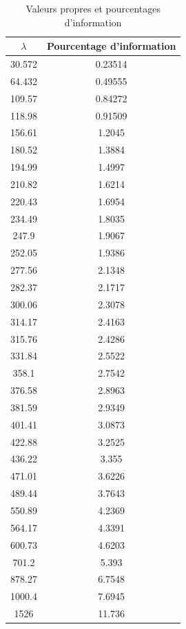 \documentclass[11pt]{article}
\begin{document}
\begin{table}[h] \centering \caption{Valeurs propres et pourcentages d'information}
\begin{tabular}{|c|c|}
  \hline
\rowcolor{gray!40}\bfseries $\lambda$ &\textbf{Pourcentage d'information}\\
  \hline
          30.572  &    0.23514\\\hline
       64.432     & 0.49555\\\hline
       109.57     & 0.84272\\\hline
       118.98      &0.91509\\\hline
       156.61       &1.2045\\\hline
       180.52       &1.3884\\\hline
       194.99       &1.4997\\\hline
       210.82       &1.6214\\\hline
       220.43       &1.6954\\\hline
       234.49       &1.8035\\\hline
        247.9       &1.9067\\\hline
       252.05      & 1.9386\\\hline
       277.56       &2.1348\\\hline
       282.37      & 2.1717\\\hline
       300.06     &  2.3078\\\hline
       314.17      & 2.4163\\\hline
       315.76       &2.4286\\\hline
       331.84       &2.5522\\\hline
        358.1     &  2.7542\\\hline
       376.58     &  2.8963\\\hline
       381.59      & 2.9349\\\hline
       401.41       &3.0873\\\hline
       422.88       &3.2525\\\hline
       436.22        &3.355\\\hline
       471.01      & 3.6226\\\hline
       489.44       &3.7643\\\hline
       550.89      & 4.2369\\\hline
       564.17       &4.3391\\\hline
       600.73       &4.6203\\\hline
        701.2        &5.393\\\hline
       878.27       &6.7548\\\hline
       1000.4       &7.6945\\\hline
         1526       &11.736\\\hline
\end{tabular}
\end{table}
\end{document}
